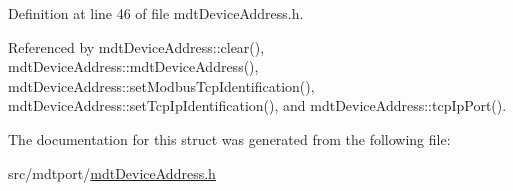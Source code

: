 Definition at line 46 of file mdt\-Device\-Address.\-h.



Referenced by mdt\-Device\-Address\-::clear(), mdt\-Device\-Address\-::mdt\-Device\-Address(), mdt\-Device\-Address\-::set\-Modbus\-Tcp\-Identification(), mdt\-Device\-Address\-::set\-Tcp\-Ip\-Identification(), and mdt\-Device\-Address\-::tcp\-Ip\-Port().



The documentation for this struct was generated from the following file\-:\begin{DoxyCompactItemize}
\item 
src/mdtport/\hyperlink{mdt_device_address_8h}{mdt\-Device\-Address.\-h}\end{DoxyCompactItemize}
